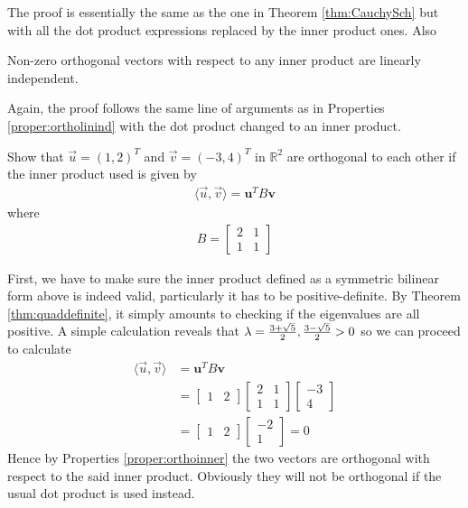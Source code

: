 The proof is essentially the same as the one in Theorem \ref{thm:CauchySch} but with all the dot product expressions replaced by the inner product ones. Also
\begin{proper}
Non-zero orthogonal vectors with respect to any inner product are linearly independent.
\end{proper}
Again, the proof follows the same line of arguments as in Properties \ref{proper:ortholinind} with the dot product changed to an inner product.

\begin{exmp}
Show that $\vec{u} = (1,2)^T$ and $\vec{v} = (-3,4)^T$ in $\mathbb{R}^2$ are orthogonal to each other if the inner product used is given by
\begin{align*}
\langle\vec{u}, \vec{v}\rangle = \textbf{u}^TB\textbf{v}
\end{align*}
where 
\begin{align*}
B = 
\begin{bmatrix}
2 & 1 \\
1 & 1
\end{bmatrix}
\end{align*}
\end{exmp}
\begin{solution}
First, we have to make sure the inner product defined as a symmetric bilinear form above is indeed valid, particularly it has to be positive-definite. By Theorem \ref{thm:quaddefinite}, it simply amounts to checking if the eigenvalues are all positive. A simple calculation reveals that $\lambda = \smash{\frac{3+\sqrt{5}}{2}, \frac{3-\sqrt{5}}{2}} > 0$ so we can proceed to calculate
\begin{align*}
\langle\vec{u}, \vec{v}\rangle &= \textbf{u}^TB\textbf{v} \\
&= \begin{bmatrix}
1 & 2
\end{bmatrix}
\begin{bmatrix}
2 & 1 \\
1 & 1
\end{bmatrix}
\begin{bmatrix}
-3 \\
4
\end{bmatrix} \\
&= \begin{bmatrix}
1 & 2
\end{bmatrix}
\begin{bmatrix}
-2 \\
1
\end{bmatrix} = 0
\end{align*}
Hence by Properties \ref{proper:orthoinner} the two vectors are orthogonal with respect to the said inner product. Obviously they will not be orthogonal if the usual dot product is used instead.
\end{solution}

